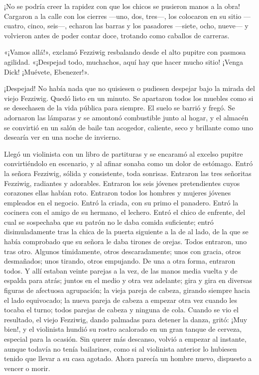 \documentclass{novela}
\begin{document}
 ¡No se podría creer la rapidez con que los chicos se pusieron manos a la obra! Cargaron a la calle con los cierres ---uno, dos, tres---, los colocaron en su sitio ---cuatro, cinco, seis---, echaron las barras y los pasadores ---siete, ocho, nueve--- y volvieron antes de poder contar doce, trotando como caballos de carreras.

 «¡Vamos allá!», exclamó Fezziwig resbalando desde el alto pupitre con pasmosa agilidad. «¡Despejad todo, muchachos, aquí hay que hacer mucho sitio! ¡Venga Dick! ¡Muévete, Ebenezer!».

 ¡Despejad! No había nada que no quisiesen o pudiesen despejar bajo la mirada del viejo Fezziwig. Quedó listo en un minuto. Se apartaron todos los muebles como si se desechasen de la vida pública para siempre. El suelo se barrió y fregó. Se adornaron las lámparas y se amontonó combustible junto al hogar, y el almacén se convirtió en un salón de baile tan acogedor, caliente, seco y brillante como uno desearía ver en una noche de invierno.

 Llegó un violinista con un libro de partituras y se encaramó al excelso pupitre convirtiéndolo en escenario, y al afinar sonaba como un dolor de estómago. Entró la señora Fezziwig, sólida y consistente, toda sonrisas. Entraron las tres señoritas Fezziwig, radiantes y adorables. Entraron los seis jóvenes pretendientes cuyos corazones ellas habían roto. Entraron todos los hombres y mujeres jóvenes empleados en el negocio. Entró la criada, con su primo el panadero. Entró la cocinera con el amigo de su hermano, el lechero. Entró el chico de enfrente, del cual se sospechaba que su patrón no le daba comida suficiente; entró disimuladamente tras la chica de la puerta siguiente a la de al lado, de la que se había comprobado que su señora le daba tirones de orejas. Todos entraron, uno tras otro. Algunos tímidamente, otros descaradamente; unos con gracia, otros desmañados; unos tirando, otros empujando. De una a otra forma, entraron todos. Y allí estaban veinte parejas a la vez, de las manos media vuelta y de espalda para atrás; juntos en el medio y otra vez adelante; gira y gira en diversas figuras de afectuosa agrupación; la vieja pareja de cabeza, girando siempre hacia el lado equivocado; la nueva pareja de cabeza a empezar otra vez cuando les tocaba el turno; todos parejas de cabeza y ninguna de cola. Cuando se vio el resultado, el viejo Fezziwig, dando palmadas para detener la danza, gritó: ¡Muy bien!, y el violinista hundió su rostro acalorado en un gran tanque de cerveza, especial para la ocasión. Sin querer más descanso, volvió a empezar al instante, aunque todavía no tenía bailarines, como si al violinista anterior lo hubiesen tenido que llevar a su casa agotado. Ahora parecía un hombre nuevo, dispuesto a vencer o morir.
\end{document}
